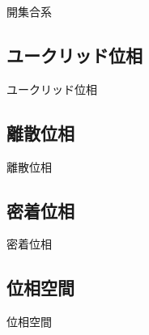 開集合系

\newpage


\subsection{ユークリッド位相}

ユークリッド位相

\newpage


\subsection{離散位相}

離散位相

\newpage


\subsection{密着位相}

密着位相

\newpage


\subsection{位相空間}

位相空間

\newpage
